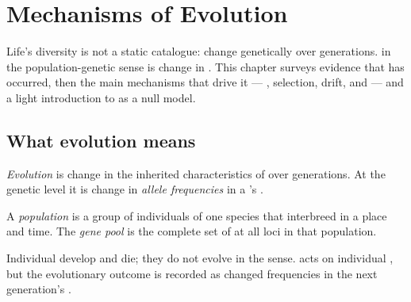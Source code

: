 \chapter{Mechanisms of Evolution}\label{ch:g11:evolution-mechanisms}

Life's diversity is not a static catalogue:  change genetically over
generations. \emph{} in the population-genetic sense is change in . This chapter surveys evidence that  has occurred, then the
main mechanisms that drive it --- , selection, drift, and  ---
and a light introduction to  as a null model.

\section{What evolution means}

\begin{definition}\label{def:g11:evolution-mechanisms:evo}
\emph{Evolution} is change in the inherited characteristics of
 over generations. At the genetic level it is change in
\emph{allele frequencies} in a 's .
\end{definition}

\begin{definition}\label{def:g11:evolution-mechanisms:pool}
A \emph{population} is a group of individuals of one species
that interbreed in a place and time. The \emph{gene pool} is
the complete set of  at all loci in that population.
\end{definition}

\begin{remark}
Individual  develop and die; they do not evolve in the  sense.
 acts on individual , but the evolutionary outcome is
recorded as changed frequencies in the next generation's .
\end{remark}


